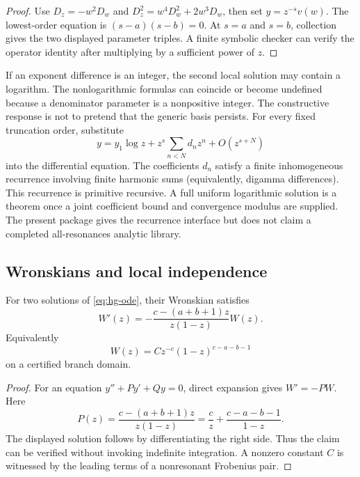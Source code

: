 \begin{proof}
Use
\(D_z=-w^2D_w\) and
\(D_z^2=w^4D_w^2+2w^3D_w\), then set
\(y=z^{-s}v(w)\).  The lowest-order equation is
\((s-a)(s-b)=0\).  At \(s=a\) and \(s=b\), collection gives the two displayed
parameter triples.  A finite symbolic checker can verify the operator
identity after multiplying by a sufficient power of \(z\).
\end{proof}

\begin{remark}[Resonance]
If an exponent difference is an integer, the second local solution may
contain a logarithm.  The nonlogarithmic formulas can coincide or become
undefined because a denominator parameter is a nonpositive integer.  The
constructive response is not to pretend that the generic basis persists.
For every fixed truncation order, substitute
\[
 y=y_1\log z+z^s\sum_{n<N}d_nz^n+O(z^{s+N})
\]
into the differential equation.  The coefficients \(d_n\) satisfy a finite
inhomogeneous recurrence involving finite harmonic sums (equivalently,
digamma differences).  This recurrence is primitive recursive.  A full
uniform logarithmic solution is a \StatusB{} theorem once a joint coefficient
bound and convergence modulus are supplied.  The present package gives the
recurrence interface but does not claim a completed all-resonances analytic
library.
\end{remark}

\subsection{Wronskians and local independence}

\begin{lemma}\label{lem:wronskian}
For two solutions of \eqref{eq:hg-ode}, their Wronskian satisfies
\[
 W'(z)=-\frac{c-(a+b+1)z}{z(1-z)}W(z).
\]
Equivalently
\[
 W(z)=Cz^{-c}(1-z)^{c-a-b-1}
\]
on a certified branch domain.
\end{lemma}

\begin{proof}
For an equation \(y''+P y'+Qy=0\), direct expansion gives
\(W'=-PW\).  Here
\[
 P(z)=\frac{c-(a+b+1)z}{z(1-z)}
      =\frac c z+\frac{c-a-b-1}{1-z}.
\]
The displayed solution follows by differentiating the right side.  Thus the
claim can be verified without invoking indefinite integration.  A nonzero
constant \(C\) is witnessed by the leading terms of a nonresonant Frobenius
pair.
\end{proof}

